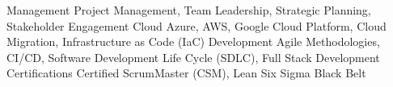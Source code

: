 
\begin{cvskills}
  \cvskill
  {Management} %
  {Project Management, Team Leadership, Strategic Planning, Stakeholder Engagement} %
  \cvskill
  {Cloud} %
  {Azure, AWS, Google Cloud Platform, Cloud Migration, Infrastructure as Code (IaC)} %
  \cvskill
  {Development} %
  {Agile Methodologies, CI/CD, Software Development Life Cycle (SDLC), Full Stack Development} %
  \cvskill
  {Certifications} %
  {Certified ScrumMaster (CSM), Lean Six Sigma Black Belt} %
\end{cvskills}
